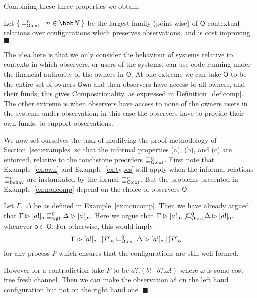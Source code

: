 \documentclass{LMCS}
\newcommand{\pfn}[1]{\mathsf{#1}}  \newcommand{\cfn}[1]{\mathsf{#1}}  \newcommand{\ownfnt}[1]{{\mathsf{#1}}}
\newcommand{\with}{\mathbin \rhd}
\newcommand{\Own}{\ensuremath{\pfn{Own}}\xspace}
\newcommand{\nats}{\ensuremath{\bbb N}\xspace}
\newcommand{\ownO}{ {\ownfnt O}}
\newcommand{\amort}[1]{\mathrel{\sqsubseteq_{\rm wgt}^{#1}}}
\newcommand{\behav}[1]{\mathrel{\sqsubseteq_{\rm behav}^{#1}}}
\newcommand{\Obscxtequiv}[2]{\mathrel{\sqsubseteq_{#1:\rm cxt}^{#2}}}
\newcommand{\Ocxtequiv}[1]{\Obscxtequiv{\ownO}{#1}}
\newcommand{\setof}[2]{\{ \, #1 \, \mid \, #2 \, \}}\newcommand{\sset}[1]{\{ {#1}  \}  }
\newcommand{\Cpar}{\mathbin{|}}
\newcommand{\Cloc}[2]{[#1]_{\ownfnt{#2}}}
\newcommand{\EndDefBox}{\null\hfill$\blacksquare$}
\newcommand{\boxHere}{\global\let\EndProof\empty\EndDefBox}
\begin{document}
\noindent
Combining these three properties we obtain:
\begin{defi}\label{def:cxtequiv}
  Let $\setof{\Ocxtequiv{n}}{ n \in \nats}$ be the largest family (point-wise) of 
   $\ownO$-contextual relations
  over configurations which preserves observations, and is  cost
  improving.\boxHere
\end{defi}
The idea here is that we only consider the behaviour of systems
relative to contexts in which observers, or users of the systems, can
use code running under the financial authority of the owners in
$\ownO$. At one extreme we can take $\ownO$ to be the entire set of
owners $\Own$ and then observers have access to all owners, and
their funds; this gives Compositionality, as expressed in Definition~\ref{def:comp}. 
The other extreme is when observers have access to
none of the owners users in the systems under observation; in this
case the observers have to provide their own funds, to support
observations. 


We now set ourselves the task of modifying the proof methodology of
Section~\ref{sec:examples} so that the informal properties (a), (b), and (c) are
enforced, relative to the touchstone preorders $\Ocxtequiv{n}$.
First note that Example~\ref{ex:own} and
Example~\ref{ex:types} still apply when the informal relations
$\behav{n}$ are instantiated by the formal $\Ocxtequiv{n}$. But the problems 
presented in 
Example~\ref{ex:noncomp} depend on the choice of observers $\ownO$:

\begin{exa}[Unsoundness]\label{ex:unsound}
  Let $\Gamma,\; \Delta$ be as defined in Example~\ref{ex:noncomp}. Then we have already argued that
\begin{math}
    \Gamma \with \Cloc{a!}{\ownfnt o}  \amort{0}  \Delta \with \Cloc{a!}{o}.
\end{math}
Here we argue that 
\begin{math}
    \Gamma \with \Cloc{a!}{o}  \not{\Ocxtequiv{0}} \Delta \with \Cloc{a!}{o}.
\end{math}
whenever $\ownfnt o  \in \ownO$. 
For otherwise, this would imply
\begin{align*}
     \Gamma \with \Cloc{a!}{o} \Cpar \Cloc{P}{o} &\Ocxtequiv{0}  \Delta \with \Cloc{a!}{o} \Cpar \Cloc{P}{o}
\end{align*}
for any process $P$  which ensures that the configurations are still well-formed.  

However for a contradiction take $P$ to be 
\begin{math}
  a?. (b! \Cpar b?. \omega!)
\end{math}
where $\omega$ is some cost-free fresh channel. 
Then we can make the observation $\omega!$ on the left hand configuration but not on the
right hand one. 
\boxHere
\end{exa}
\end{document}
